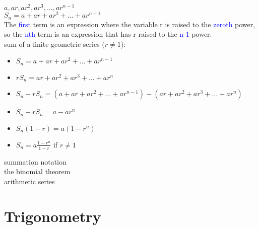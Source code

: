 \documentclass{article}
\begin{document}
$a, ar, ar^2, ar^3, \ldots, ar^{n-1}$\\
$S_n = a + ar + ar^2 + \ldots + ar^{n-1}$\\

The \textcolor{blue}{first} term is an expression where the variable r is raised to the \textcolor{blue}{zeroth} power, so the \textcolor{blue}{nth} term is an expression that has r raised to the \textcolor{blue}{n-1} power.\\ 

sum of a finite geometric series ($r \neq 1$):
	\begin{itemize}
		\item $S_n = a + ar + ar^2 + \ldots + ar^{n-1}$ 
		\item $rS_n = ar + ar^2 + ar^3 + \ldots + ar^{n}$   
		\item $S_n - rS_n = (a + ar + ar^2 + \ldots + ar^{n-1}) - (ar + ar^2 + ar^3 + \ldots + ar^{n})$
		\item $S_n - rS_n = a - ar^n$
		\item $S_n(1 - r) = a(1 - r^n)$
		\item $S_n = a\frac{1 - r^n}{1 - r}$ if $r \neq 1$ 
	\end{itemize}

summation notation\\
the binomial theorem\\
arithmetic series\\

\newpage
\section*{Trigonometry}
\end{document}
